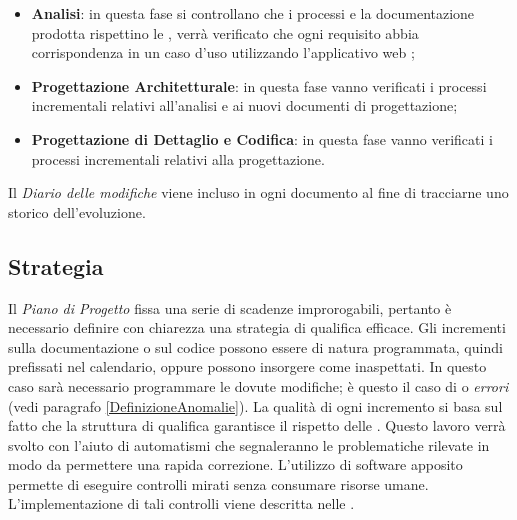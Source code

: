 	\begin{itemize}
		\item \textbf{Analisi}: in questa fase si controllano che i processi e la documentazione prodotta rispettino le \NormeDiProgetto{}, verrà verificato che ogni requisito abbia corrispondenza in un caso d’uso utilizzando l’applicativo web ;
		\item \textbf{Progettazione Architetturale}: in questa fase vanno verificati i processi incrementali relativi all'analisi e ai nuovi documenti di progettazione;
		\item \textbf{Progettazione di Dettaglio e Codifica}: in questa fase vanno verificati i processi incrementali relativi alla progettazione.
	\end{itemize}
	
	Il \emph{Diario delle modifiche} viene incluso in ogni documento al fine di tracciarne uno storico dell'evoluzione.
	
	\subsection{Strategia}

		Il \emph{Piano di Progetto} fissa una serie di scadenze improrogabili, pertanto è necessario definire con chiarezza una strategia di qualifica efficace. Gli incrementi sulla documentazione o sul codice possono essere di natura programmata, quindi prefissati nel calendario, oppure possono insorgere come inaspettati. In questo caso sarà necessario programmare le dovute modifiche; è questo il caso di  o \emph{errori} (vedi paragrafo \ref{DefinizioneAnomalie}). La qualità di ogni incremento si basa sul fatto che la struttura di qualifica garantisce il rispetto delle  \NormeDiProgetto{}. Questo lavoro verrà svolto con l'aiuto di automatismi che segnaleranno le problematiche rilevate in modo da permettere una rapida correzione. L'utilizzo di software apposito permette di eseguire controlli mirati senza consumare risorse umane. L'implementazione di tali controlli viene descritta nelle \NormeDiProgetto{}.
			

